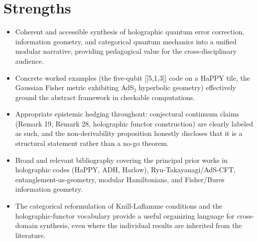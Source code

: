 \documentclass[11pt]{article}
\begin{document}
\section*{Strengths}
\begin{itemize}[leftmargin=*]
  \item Coherent and accessible synthesis of holographic quantum error correction, information geometry, and categorical quantum mechanics into a unified modular narrative, providing pedagogical value for the cross-disciplinary audience.
  \item Concrete worked examples (the five-qubit [[5,1,3]] code on a HaPPY tile, the Gaussian Fisher metric exhibiting AdS₂ hyperbolic geometry) effectively ground the abstract framework in checkable computations.
  \item Appropriate epistemic hedging throughout: conjectural continuum claims (Remark 19, Remark 28, holographic functor construction) are clearly labeled as such, and the non-derivability proposition honestly discloses that it is a structural statement rather than a no-go theorem.
  \item Broad and relevant bibliography covering the principal prior works in holographic codes (HaPPY, ADH, Harlow), Ryu-Takayanagi/AdS-CFT, entanglement-as-geometry, modular Hamiltonians, and Fisher/Bures information geometry.
  \item The categorical reformulation of Knill-Laflamme conditions and the holographic-functor vocabulary provide a useful organizing language for cross-domain synthesis, even where the individual results are inherited from the literature.
\end{itemize}
\end{document}

